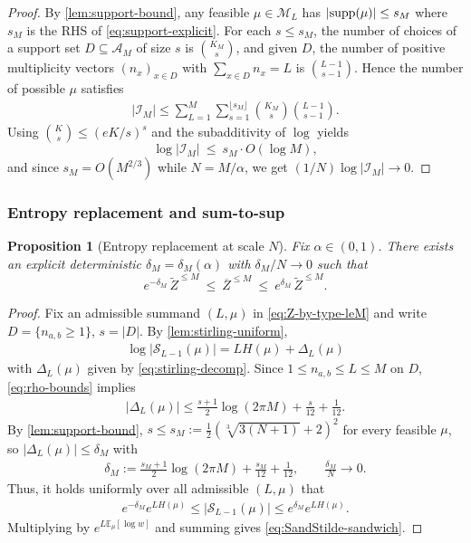 \documentclass[11pt]{amsart}
\numberwithin{equation}{section}
\numberwithin{equation}{section}
\newcommand{\1}{\mathbbm{1}}
\newcommand{\calS}{\mathcal{S}}
\newcommand{\E}{\mathbb{E}}
\newcommand{\supp}{\textup{supp}}
\newtheorem{proposition}[theorem]{Proposition}
\theoremstyle{definition}
\begin{document}
\begin{proof}
By \cref{lem:support-bound}, any feasible $\mu\in\mathcal M_L$
has $|\supp(\mu)|\le s_M$ where $s_M$ is the RHS of \eqref{eq:support-explicit}.
For each $s\le s_M$, the number of choices of a support set $D\subseteq\mathcal A_M$ of size $s$ is $\binom{K_M}{s}$,
and given $D$, the number of positive multiplicity vectors $(n_x)_{x\in D}$ with $\sum_{x\in D}n_x=L$
is $\binom{L-1}{s-1}$. Hence the number of possible $\mu$ satisfies
\begin{align*}
    |\mathcal I_M| \leq \sum_{L=1}^{M}\sum_{s=1}^{\lfloor s_M\rfloor}\binom{K_M}{s}\binom{L-1}{s-1}.
\end{align*}
Using $\binom{K}{s}\le (eK/s)^s$ and the subadditivity of $\log$ yields
\[
\log|\mathcal I_M|\ \le\ s_M\cdot O(\log M),
\]
and since $s_M=O(M^{2/3})$ while $N=M/\alpha$, we get $(1/N)\log|\mathcal I_M|\to 0$.
\end{proof}

\subsubsection{Entropy replacement and sum-to-sup}

\begin{proposition}[Entropy replacement at scale $N$]\label{prop:entropy-replacement}
Fix $\alpha \in (0,1)$. There exists an explicit deterministic $\delta_M=\delta_M(\alpha)$ with
$\delta_M/N\to 0$ such that
\begin{equation}\label{eq:SandStilde-sandwich}
e^{-\delta_M}\,\widetilde{Z}^{\le M}\ \le\ \overline{Z}^{\le M}\ \le\ e^{\delta_M}\,\widetilde{Z}^{\le M}.
\end{equation}
\end{proposition}

\begin{proof}
Fix an admissible summand $(L,\mu)$ in \eqref{eq:Z-by-type-leM} and write $D=\{n_{a,b}\ge 1\}$, $s=|D|$.
By \cref{lem:stirling-uniform},
\begin{align*}
    \log|\calS_{L-1}(\mu)|=LH(\mu)+\Delta_L(\mu)
\end{align*}
with $\Delta_L(\mu)$ given by \eqref{eq:stirling-decomp}.
Since $1\le n_{a,b}\le L\le M$ on $D$, \eqref{eq:rho-bounds} implies
\begin{align*}
    |\Delta_L(\mu)| \le \frac{s+1}{2}\log(2\pi M)+\frac{s}{12}+\frac{1}{12}.
\end{align*}
By \cref{lem:support-bound}, $s\le s_M:=\frac12(\sqrt[3]{3(N+1)}+2)^2$ for every feasible $\mu$, so $|\Delta_L(\mu)|\le \delta_M$ with
\begin{align*}
    \delta_M:=\frac{s_M+1}{2}\log(2\pi M)+\frac{s_M}{12}+\frac{1}{12}, \qquad \frac{\delta_M}{N}\to 0.
\end{align*}
Thus, it holds uniformly over all admissible $(L,\mu)$ that
\begin{align*}
    e^{-\delta_M}e^{LH(\mu)}\le |\calS_{L-1}(\mu)|\le e^{\delta_M}e^{LH(\mu)}.
\end{align*}
Multiplying by $e^{L\E_\mu[\log w]}$ and summing gives \eqref{eq:SandStilde-sandwich}.
\end{proof}
\end{document}
